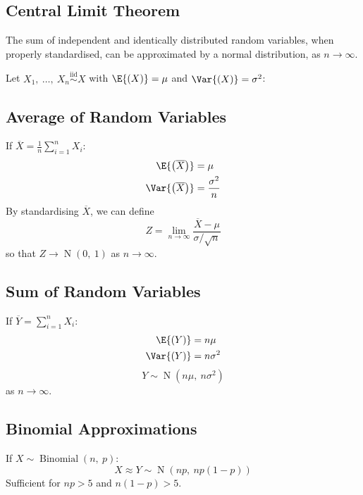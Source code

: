 \documentclass{article}
\begin{document}
\begin{minipage}{126.1962963mm}
    \begin{multicols}{2}
        \section{Central Limit Theorem}
        The sum of independent and identically distributed random variables, when properly standardised,
        can be approximated by a normal distribution, as \(n \to \infty\).

        Let \(X_1,\: \ldots,\: X_n \overset{\mathrm{iid}}{\sim} X\) with
        \(\E{\left( X \right)} = \mu\) and \(\Var{\left( X \right)} = \sigma^2\):
        \subsection{Average of Random Variables}
        If \(\overline{X} = \frac{1}{n} \sum_{i = 1}^n X_i\):
        \begin{align*}
            \E{\left( \overline{X} \right)}   & = \mu                \\
            \Var{\left( \overline{X} \right)} & = \frac{\sigma^2}{n}
        \end{align*}
        By standardising \(\overline{X}\), we can define
        \begin{equation*}
            Z = \lim_{n \to \infty} \frac{\overline{X} - \mu}{\sigma / \sqrt{n}}
        \end{equation*}
        so that \(Z \to \operatorname{N}{\left( 0,\: 1 \right)}\) as \(n \to \infty\).
        \subsection{Sum of Random Variables}
        If \(\overline{Y} = \sum_{i = 1}^n X_i\):
        \begin{align*}
            \E{\left( Y \right)}   & = n \mu      \\
            \Var{\left( Y \right)} & = n \sigma^2
        \end{align*}
        \begin{equation*}
            Y \sim \operatorname{N}{\left( n \mu,\: n \sigma^2 \right)}
        \end{equation*}
        as \(n \to \infty\).
        \subsection{Binomial Approximations}
        If \(X \sim \operatorname{Binomial}{\left( n,\: p \right)}\):
        \begin{equation*}
            X \approx Y \sim \operatorname{N}{\left( np,\: np\left( 1 - p \right) \right)}
        \end{equation*}
        Sufficient for \(np > 5\) and \(n\left( 1 - p \right) > 5\).


\end{multicols}
\end{minipage}
\end{document}
